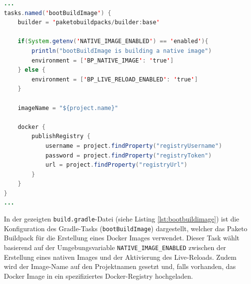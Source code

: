 \begin{lstlisting}[language=Java, caption={Gradle Task für die Erstellung eines Docker Images mit Paketo Buildpacks.},label={lst:bootbuildimage}]
...
tasks.named('bootBuildImage') {
    builder = 'paketobuildpacks/builder:base'

    if(System.getenv('NATIVE_IMAGE_ENABLED') == 'enabled'){
        println("bootBuildImage is building a native image")
        environment = ['BP_NATIVE_IMAGE': 'true']
    } else {
        environment = ['BP_LIVE_RELOAD_ENABLED': 'true']
    }

    imageName = "${project.name}"

    docker {
        publishRegistry {
            username = project.findProperty("registryUsername")
            password = project.findProperty("registryToken")
            url = project.findProperty("registryUrl")
        }
    }
}
...
\end{lstlisting}
In der gezeigten \lstinline{build.gradle}-Datei (siehe Listing \ref{lst:bootbuildimage}) ist die Konfiguration des Gradle-Tasks (\lstinline{bootBuildImage}) dargestellt, welcher das Paketo Buildpack für die Erstellung eines Docker Images verwendet. Dieser Task wählt basierend auf der Umgebungsvariable \lstinline{NATIVE_IMAGE_ENABLED} zwischen der Erstellung eines nativen Images und der Aktivierung des Live-Reloads. Zudem wird der Image-Name auf den Projektnamen gesetzt und, falls vorhanden, das Docker Image in ein spezifiziertes Docker-Registry hochgeladen.
\chapterend